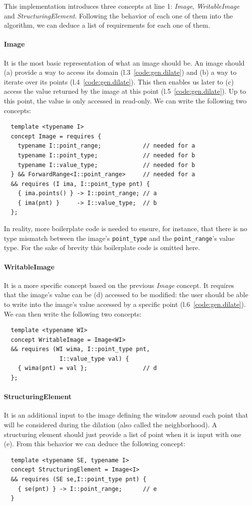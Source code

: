 This implementation introduces three concepts at line 1: \emph{Image}, \emph{WritableImage} and
\emph{StructuringElement}. Following the behavior of each one of them into the algorithm, we can deduce a list of
requirements for each one of them.

\paragraph{Image} It is the most basic representation of what an image should be. An image should (a) provide a way to
access its domain (l.3~\cref{code:gen.dilate}) and (b) a way to iterate over its points (l.4~\cref{code:gen.dilate}).
This then enables us later to (c) access the value returned by the image at this point (l.5~\cref{code:gen.dilate}). Up
to this point, the value is only accessed in read-only. We can write the following two concepts:
\begin{verbatim}
  template <typename I>
  concept Image = requires {
    typename I::point_range;            // needed for a
    typename I::point_type;             // needed for b
    typename I::value_type;             // needed for b
  } && ForwardRange<I::point_range>     // needed for a
  && requires (I ima, I::point_type pnt) {
    { ima.points() } -> I::point_range; // a
    { ima(pnt) }     -> I::value_type;  // b
  };
\end{verbatim}
In reality, more boilerplate code is needed to ensure, for instance, that there is no type mismatch between the image's
\texttt{point\_type} and the \texttt{point\_range}'s value type. For the sake of brevity this boilerplate code is
omitted here.

\paragraph{WritableImage} It is a more specific concept based on the previous \emph{Image} concept. It requires that the
image's value can be (d) accessed to be modified: the user should be able to write into the image's value accessed by a
specific point (l.6~\cref{code:gen.dilate}). We can then write the following two concepts:
\begin{verbatim}
  template <typename WI>
  concept WritableImage = Image<WI>
  && requires (WI wima, I::point_type pnt,
                I::value_type val) {
    { wima(pnt) = val };                // d
  };
\end{verbatim}

\paragraph{StructuringElement} It is an additional input to the image defining the window around each point that will be
considered during the dilation (also called the neighborhood). A structuring element should just provide a list of point
when it is input with one (e). From this behavior we can deduce the following concept:
\begin{verbatim}
  template <typename SE, typename I>
  concept StructuringElement = Image<I>
  && requires (SE se,I::point_type pnt) {
    { se(pnt) } -> I::point_range;      // e
  }
\end{verbatim}

